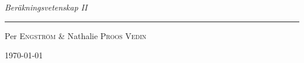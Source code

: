 \begin{center}

\vspace*{5cm}


\emph{\Large Beräkningsvetenskap II}

\rule{0.7\textwidth}{1pt}

Per \textsc{Engström} \& Nathalie \textsc{Proos Vedin}

\today

\end{center}

\thispagestyle{empty}
